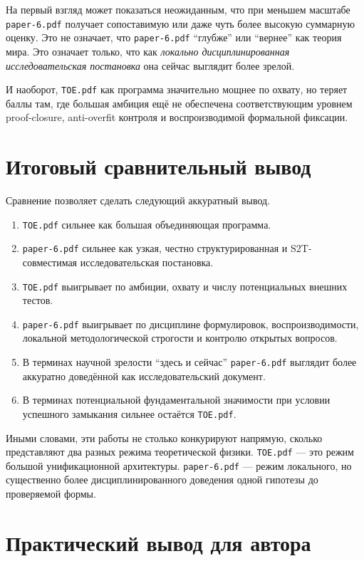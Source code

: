 \documentclass[12pt,a4paper]{article}
\begin{document}
На первый взгляд может показаться неожиданным, что при меньшем масштабе \texttt{paper-6.pdf} получает сопоставимую или даже чуть более высокую суммарную оценку. Это не означает, что \texttt{paper-6.pdf} ``глубже'' или ``вернее'' как теория мира. Это означает только, что как \emph{локально дисциплинированная исследовательская постановка} она сейчас выглядит более зрелой.

И наоборот, \texttt{TOE.pdf} как программа значительно мощнее по охвату, но теряет баллы там, где большая амбиция ещё не обеспечена соответствующим уровнем proof-closure, anti-overfit контроля и воспроизводимой формальной фиксации.

\section{Итоговый сравнительный вывод}

Сравнение позволяет сделать следующий аккуратный вывод.

\begin{enumerate}
    \item \texttt{TOE.pdf} сильнее как большая объединяющая программа.
    \item \texttt{paper-6.pdf} сильнее как узкая, честно структурированная и S2T-совместимая исследовательская постановка.
    \item \texttt{TOE.pdf} выигрывает по амбиции, охвату и числу потенциальных внешних тестов.
    \item \texttt{paper-6.pdf} выигрывает по дисциплине формулировок, воспроизводимости, локальной методологической строгости и контролю открытых вопросов.
    \item В терминах научной зрелости ``здесь и сейчас'' \texttt{paper-6.pdf} выглядит более аккуратно доведённой как исследовательский документ.
    \item В терминах потенциальной фундаментальной значимости при условии успешного замыкания сильнее остаётся \texttt{TOE.pdf}.
\end{enumerate}

Иными словами, эти работы не столько конкурируют напрямую, сколько представляют два разных режима теоретической физики. \texttt{TOE.pdf} --- это режим большой унификационной архитектуры. \texttt{paper-6.pdf} --- режим локального, но существенно более дисциплинированного доведения одной гипотезы до проверяемой формы.

\section{Практический вывод для автора}
\end{document}
